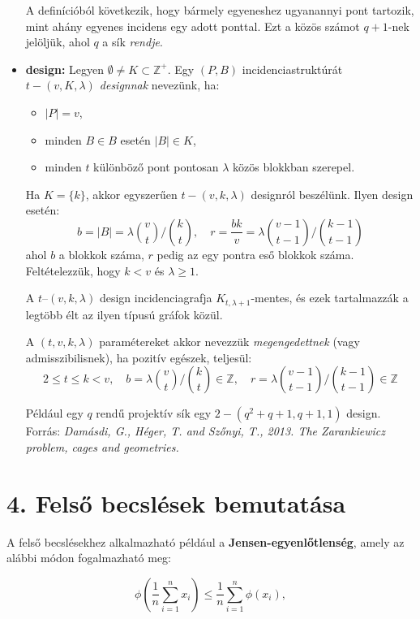 \documentclass[12pt,a4paper]{article}
\begin{document}
\begin{itemize}
    A definícióból következik, hogy bármely egyeneshez ugyanannyi pont tartozik, mint ahány egyenes incidens egy adott ponttal. Ezt a közös számot $q+1$-nek jelöljük, ahol $q$ a sík \emph{rendje}.
    \item {} \textbf{design:} Legyen $\emptyset \neq K \subset \mathbb{Z}^+$. Egy $(P, B)$ incidenciastruktúrát \emph{$t-(v, K, \lambda)$ designnak} nevezünk, ha:
    \begin{itemize}[nosep]
      \item $|P| = v$,
      \item minden $B \in B$ esetén $|B| \in K$,
      \item minden $t$ különböző pont pontosan $\lambda$ közös blokkban szerepel.
    \end{itemize}
    Ha $K = \{k\}$, akkor egyszerűen $t-(v, k, \lambda)$ designról beszélünk.
    Ilyen design esetén:
    \[
    b = |B| = \lambda \binom{v}{t} \bigg/ \binom{k}{t}, \quad
    r = \frac{bk}{v} = \lambda \binom{v-1}{t-1} \bigg/ \binom{k-1}{t-1}
    \]
    ahol $b$ a blokkok száma, $r$ pedig az egy pontra eső blokkok száma. Feltételezzük, hogy $k < v$ és $\lambda \geq 1$.
    
    A $t$--$(v, k, \lambda)$ design incidenciagrafja $K_{t, \lambda+1}$-mentes, és ezek tartalmazzák a legtöbb élt az ilyen típusú gráfok közül.
    
    A $(t, v, k, \lambda)$ paramétereket akkor nevezzük \emph{megengedettnek} (vagy admisszibilisnek), ha pozitív egészek, teljesül:
    \[
    2 \leq t \leq k < v, \quad
    b = \lambda \binom{v}{t} \bigg/ \binom{k}{t} \in \mathbb{Z}, \quad
    r = \lambda \binom{v-1}{t-1} \bigg/ \binom{k-1}{t-1} \in \mathbb{Z}
    \]
    
    Például egy $q$ rendű projektív sík egy $2-(q^2 + q + 1, q + 1, 1)$ design.
    \\[5mm]
    \noindent Forrás: \textit{Damásdi, G., Héger, T. and Szőnyi, T., 2013. The Zarankiewicz problem, cages and geometries.} \cite{damasdi2013zarankiewicz}
\end{itemize}

\section*{4. Felső becslések bemutatása}
A felső becslésekhez alkalmazható például a \textbf{Jensen-egyenlőtlenség}, amely az alábbi módon fogalmazható meg:

\[
\phi\left( \frac{1}{n} \sum_{i=1}^{n} x_i \right) \leq \frac{1}{n} \sum_{i=1}^{n} \phi(x_i),
\]
\end{document}
